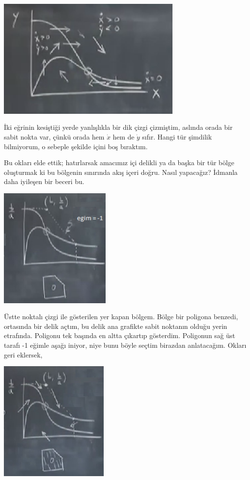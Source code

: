 \documentclass[12pt,fleqn]{article}\usepackage{../../common}
\begin{document}
\includegraphics[height=6cm]{09_14.png}

İki eğrinin kesiştiği yerde yanlışlıkla bir dik çizgi çizmiştim, aslında orada
bir sabit nokta var, çünkü orada hem $\dot{x}$ hem de $\dot{y}$ sıfır. Hangi tür
şimdilik bilmiyorum, o sebeple şekilde içini boş bıraktım.

Bu okları elde ettik; hatırlarsak amacımız içi delikli ya da başka bir tür bölge
oluşturmak ki bu bölgenin sınırında akış içeri doğru. Nasıl yapacağız? İdmanla
daha iyileşen bir beceri bu.

\includegraphics[height=6cm]{09_15.png}

Üstte noktalı çizgi ile gösterilen yer kapan bölgem. Bölge bir poligona benzedi,
ortasında bir delik açtım, bu delik ana grafikte sabit noktanın olduğu yerin
etrafında. Poligonu tek başında en altta çıkartıp gösterdim. Poligonun sağ üst
tarafı -1 eğimle aşağı iniyor, niye bunu böyle seçtim birazdan
anlatacağım. Okları geri eklersek,

\includegraphics[height=6cm]{09_16.png}
\end{document}
